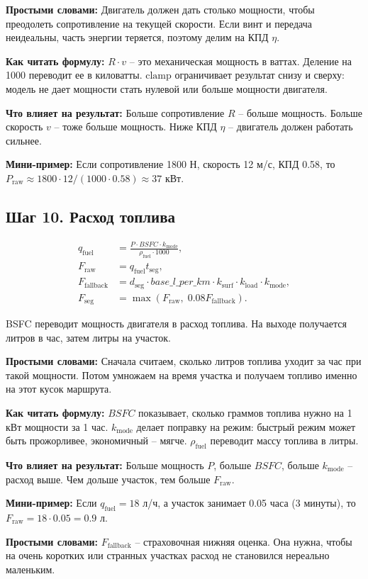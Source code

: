 \documentclass[12pt,a4paper]{article}
\newcommand{\simple}[1]{\par\smallskip\noindent\textbf{Простыми словами:} #1\par}
\newcommand{\howto}[1]{\par\smallskip\noindent\textbf{Как читать формулу:} #1\par}
\newcommand{\effect}[1]{\par\smallskip\noindent\textbf{Что влияет на результат:} #1\par}
\newcommand{\exampletext}[1]{\par\smallskip\noindent\textbf{Мини-пример:} #1\par}
\begin{document}
\simple{Двигатель должен дать столько мощности, чтобы преодолеть сопротивление
на текущей скорости. Если винт и передача неидеальны, часть энергии теряется,
поэтому делим на КПД \(\eta\).}
\howto{\(R \cdot v\) -- это механическая мощность в ваттах. Деление на 1000
переводит ее в киловатты. \(\mathrm{clamp}\) ограничивает результат снизу и
сверху: модель не дает мощности стать нулевой или больше мощности двигателя.}
\effect{Больше сопротивление \(R\) -- больше мощность. Больше скорость \(v\) --
тоже больше мощность. Ниже КПД \(\eta\) -- двигатель должен работать сильнее.}
\exampletext{Если сопротивление 1800 Н, скорость 12 м/с, КПД 0.58, то
\(P_{\mathrm{raw}}\approx1800\cdot12/(1000\cdot0.58)\approx37\) кВт.}

\subsection{Шаг 10. Расход топлива}

\begin{align}
q_{\mathrm{fuel}} &=
\frac{P \cdot BSFC \cdot k_{\mathrm{mode}}}{\rho_{\mathrm{fuel}}\cdot1000}, \\
F_{\mathrm{raw}} &= q_{\mathrm{fuel}}t_{\mathrm{seg}}, \\
F_{\mathrm{fallback}} &=
d_{\mathrm{seg}}\cdot base\_l\_per\_km \cdot k_{\mathrm{surf}}
\cdot k_{\mathrm{load}}\cdot k_{\mathrm{mode}}, \\
F_{\mathrm{seg}} &=
\max\left(F_{\mathrm{raw}},\; 0.08F_{\mathrm{fallback}}\right).
\end{align}

BSFC переводит мощность двигателя в расход топлива. На выходе получается
литров в час, затем литры на участок.

\simple{Сначала считаем, сколько литров топлива уходит за час при такой
мощности. Потом умножаем на время участка и получаем топливо именно на этот
кусок маршрута.}
\howto{\(BSFC\) показывает, сколько граммов топлива нужно на 1 кВт мощности за
1 час. \(k_{\mathrm{mode}}\) делает поправку на режим: быстрый режим может быть
прожорливее, экономичный -- мягче. \(\rho_{\mathrm{fuel}}\) переводит массу
топлива в литры.}
\effect{Больше мощность \(P\), больше \(BSFC\), больше \(k_{\mathrm{mode}}\) --
расход выше. Чем дольше участок, тем больше \(F_{\mathrm{raw}}\).}
\exampletext{Если \(q_{\mathrm{fuel}}=18\) л/ч, а участок занимает 0.05 часа
(3 минуты), то \(F_{\mathrm{raw}}=18\cdot0.05=0.9\) л.}

\simple{\(F_{\mathrm{fallback}}\) -- страховочная нижняя оценка. Она нужна,
чтобы на очень коротких или странных участках расход не становился нереально
маленьким.}
\end{document}
